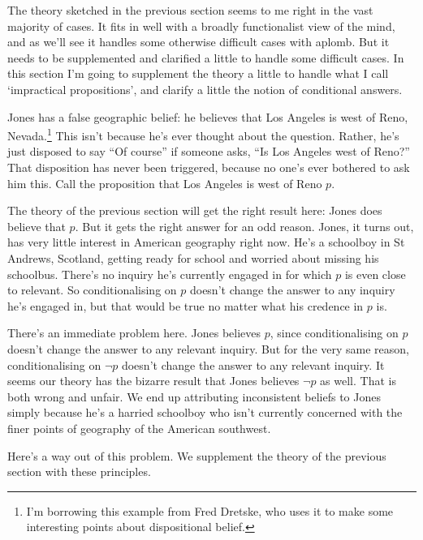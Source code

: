 The theory sketched in the previous section seems to me right in the vast majority of cases. It fits in well with a broadly functionalist view of the mind, and as we'll see it handles some otherwise difficult cases with aplomb. But it needs to be supplemented and clarified a little to handle some difficult cases. In this section I'm going to supplement the theory a little to handle what I call `impractical propositions', and clarify a little the notion of conditional answers.

Jones has a false geographic belief: he believes that Los Angeles is west of Reno, Nevada.\footnote{I'm borrowing this example from Fred Dretske, who uses it to make some interesting points about dispositional belief.} This isn't because he's ever thought about the question. Rather, he's just disposed to say ``Of course'' if someone asks, ``Is Los Angeles west of Reno?'' That disposition has never been triggered, because no one's ever bothered to ask him this. Call the proposition that Los Angeles is west of Reno \(p\). 

The theory of the previous section will get the right result here: Jones does believe that \(p\). But it gets the right answer for an odd reason. Jones, it turns out, has very little interest in American geography right now. He's a schoolboy in St Andrews, Scotland, getting ready for school and worried about missing his schoolbus. There's no inquiry he's currently engaged in for which \(p\) is even close to relevant. So conditionalising on \(p\) doesn't change the answer to any inquiry he's engaged in, but that would be true no matter what his credence in \(p\) is.

There's an immediate problem here. Jones believes \(p\), since conditionalising on \(p\) doesn't change the answer to any relevant inquiry. But for the very same reason, conditionalising on \(\neg p\) doesn't change the answer to any relevant inquiry. It seems our theory has the bizarre result that Jones believes \(\neg p\) as well. That is both wrong and unfair. We end up attributing inconsistent beliefs to Jones simply because he's a harried schoolboy who isn't currently concerned with the finer points of geography of the American southwest.

Here's a way out of this problem. We supplement the theory of the previous section with these principles.

